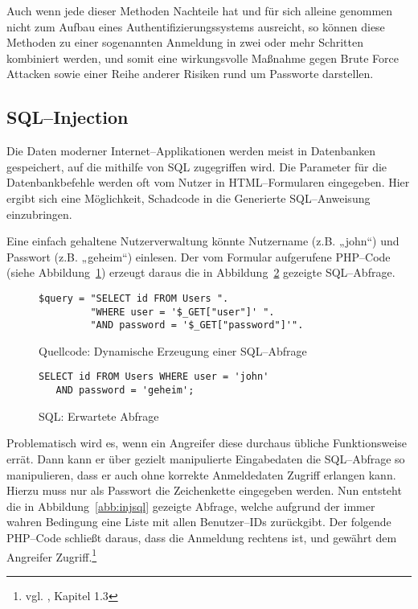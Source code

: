 Auch wenn jede dieser Methoden Nachteile hat und für sich alleine genommen nicht zum Aufbau eines Authentifizierungssystems ausreicht, so können diese Methoden zu einer sogenannten Anmeldung in zwei oder mehr Schritten kombiniert werden, und somit eine wirkungsvolle Maßnahme gegen Brute Force Attacken sowie einer Reihe anderer Risiken rund um Passworte darstellen.

\subsection{SQL--Injection}

Die Daten moderner Internet--Applikationen werden meist in Datenbanken gespeichert, auf die mithilfe von \ac{SQL} zugegriffen wird. Die Parameter für die Datenbankbefehle werden oft vom Nutzer in HTML--Formularen eingegeben. Hier ergibt sich eine Möglichkeit, Schadcode in die Generierte SQL--Anweisung einzubringen.

Eine einfach gehaltene Nutzerverwaltung könnte Nutzername (z.B. „john“) und Passwort (z.B. „geheim“) einlesen. Der vom Formular aufgerufene PHP--Code (siehe Abbildung~\ref{abb:dysql}) erzeugt daraus die in Abbildung~\ref{abb:expsql} gezeigte SQL--Abfrage.

\begin{figure}[h]
\begin{verbatim}
$query = "SELECT id FROM Users ".
         "WHERE user = '$_GET["user"]' ".
         "AND password = '$_GET["password"]'".
\end{verbatim}
\caption{Quellcode: Dynamische Erzeugung einer SQL--Abfrage}
\label{abb:dysql}
\end{figure}

\begin{figure}[h]
\begin{verbatim}
SELECT id FROM Users WHERE user = 'john' 
   AND password = 'geheim';
\end{verbatim}
\caption{SQL: Erwartete Abfrage}
\label{abb:expsql}
\end{figure}

Problematisch wird es, wenn ein Angreifer diese durchaus übliche Funktionsweise errät. Dann kann er über gezielt manipulierte Eingabedaten die SQL--Abfrage so manipulieren, dass er auch ohne korrekte Anmeldedaten Zugriff erlangen kann. Hierzu muss nur als Passwort die Zeichenkette  eingegeben werden. Nun entsteht die in Abbildung~\ref{abb:injsql} gezeigte Abfrage, welche aufgrund der immer wahren Bedingung  eine Liste mit allen Benutzer--IDs zurückgibt. Der folgende PHP--Code schließt daraus, dass die Anmeldung rechtens ist, und gewährt dem Angreifer Zugriff.\footnote{vgl. \cite{clarke}, Kapitel 1.3}

